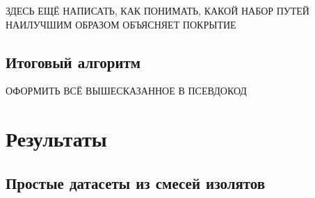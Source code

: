 \documentclass{spbau-diploma}
\begin{document}
ЗДЕСЬ ЕЩЁ НАПИСАТЬ, КАК ПОНИМАТЬ, КАКОЙ НАБОР ПУТЕЙ НАИЛУЧШИМ ОБРАЗОМ ОБЪЯСНЯЕТ ПОКРЫТИЕ


\subsection{Итоговый алгоритм}

ОФОРМИТЬ ВСЁ ВЫШЕСКАЗАННОЕ В ПСЕВДОКОД



\section{Результаты}
\subsection{Простые датасеты из смесей изолятов}
\end{document}
